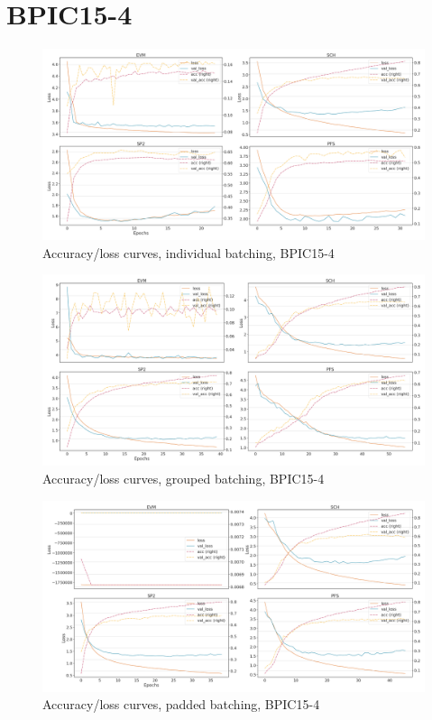 \section*{BPIC15-4}
\begin{figure}[!htb]
    \centering
    \includegraphics[width=\textwidth]{gfx/bpic2015_4/individual_loss_acc_curve.png}
    \caption{Accuracy/loss curves, individual batching, BPIC15-4}
\end{figure}
\begin{figure}[!htb]
    \centering
    \includegraphics[width=\textwidth]{gfx/bpic2015_4/grouped_loss_acc_curve.png}
    \caption{Accuracy/loss curves, grouped batching, BPIC15-4}
\end{figure}
\begin{figure}[!htb]
    \centering
    \includegraphics[width=\textwidth]{gfx/bpic2015_4/padded_loss_acc_curve.png}
    \caption{Accuracy/loss curves, padded batching, BPIC15-4}
\end{figure}

